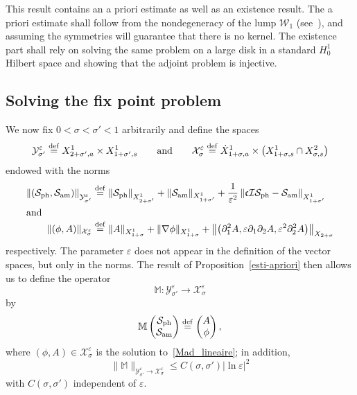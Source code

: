 \documentclass[10pt]{amsart}
\theoremstyle{definition}\newtheorem{defi}[theo]{Definition}\newtheorem{rema}[theo]{Remark}\newtheorem{exam}[theo]{Example}\newtheorem{exem}[theo]{Example}\newtheorem{nota}[theo]{Notation}
\newcommand*\p{\partial}
\newcommand{\bbM}{\mathbb{M}}
\newcommand*\ddef{\stackrel{\rm def}{=}}
\newcommand{\amm}{\mathrm{am}}
\newcommand{\phl}{\mathrm{ph}}
\newcommand*\BI{\mathcal{I}}
\newcommand*\BS{\mathcal{S}}
\newcommand*\BW{\mathcal{W}}
\newcommand*\BX{\mathcal{X}}
\newcommand*\BY{\mathcal{Y}}
\newcommand*\cs{{\mathfrak c}}
\newcommand*\ls{\leqslant }
\newcommand*\e{\varepsilon}
\newcommand*\lne{\lvert \ln \varepsilon \rvert}
\newcommand*\s{\sigma}
\begin{document}
This result contains an a priori estimate as well as an existence result. The a priori estimate shall follow from the nondegeneracy of the lump $ \BW_1 $ (see~\cite[Theorem~\ref{Lump_nondege}]{Liu_Wei_Lump}), and assuming the symmetries will guarantee that there is no kernel. The existence part shall rely on solving the same problem on a large disk in a standard $ H^1_0$ Hilbert space and showing that the adjoint problem is injective.



\subsection{Solving the fix point problem}


We now fix $ 0 < \s < \s' < 1 $ arbitrarily and define the spaces
\[
\BY^{\e}_{\s' } \ddef X^{1}_{ 2+\s', a} \times X^1_{ 1+ \s', s }
\qquad\text{and} \qquad
\BX^{\e}_{\s} \ddef \dot{X}^1_{1+\s, a} \times \left(X^1_{1+\s, s} \cap X^2_{\s, s} \right)
\]
endowed with the norms
\begin{align*}
\left\| \left(\BS_{\phl}, \BS_{\amm}\right) \right\|_{ \BY^{\e}_{\s'} }
&\ddef \left\| \BS_{\phl} \right\|_{X^1_{2+\s'}} + \| \BS_{\amm} \|_{X^1_{1+\s'}} + \frac{1}{\e^2} \left\| \cs \BI \BS_{\phl} - \BS_{\amm} \right\|_{X^1_{1+\s'}}
\\
\intertext{and}
\| (\phi, A) \|_{ \BX^\e_{\s} }
&\ddef \| A \|_{X^{1}_{ 1+\s}} + \| \nabla \phi \|_{X^{1}_{ 1+ \s}} + \left\| \left(\p_1^2 A, \e \p_1\p_2 A, \e^2 \p_2^2 A\right)\right\|_{X_{ 2+\s}}
\end{align*}
respectively. The parameter $ \e $ does not appear in the definition of the vector spaces, but only in the norms. The result of Proposition~\ref{esti-apriori} then allows us to define the operator
\[
\bbM : \BY^\e_{\s'} \to \BX^\e_{\s}
\]
by
\[
\bbM
\begin{pmatrix} \BS_{\phl} \\ \BS_{\amm}
\end{pmatrix}
\ddef
\begin{pmatrix} A \\ \phi
\end{pmatrix},
\]
where $ (\phi, A) \in \BX^\e_{\s} $ is the solution to~\eqref{Mad_lineaire}; in addition,
\[
\| \bbM \|_{ \BY^\e_{\s'} \to \BX^\e_{\s} } \ls C (\s, \s') \lne^2
\]
with $ C (\s, \s') $ independent of $ \e $.
\end{document}
